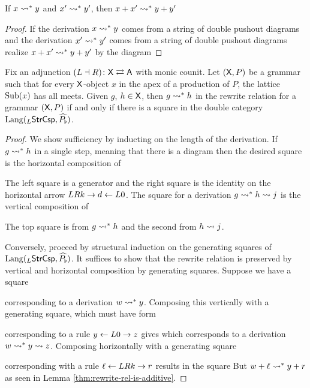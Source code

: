 \documentclass{amsart}
\begin{document}
\begin{lemma} \label{thm:rewrite-rel-is-additive}
  If $ x \rightsquigarrow^\ast y $ and $ x' \rightsquigarrow^\ast y' $, then
  $ x+x' \rightsquigarrow^\ast y+y' $
\end{lemma}

\begin{proof}
  If the derivation $ x \rightsquigarrow^\ast y $ comes from a string of
  double pushout diagrams
   and the derivation
  $ x' \rightsquigarrow^\ast y' $ comes from a string of double pushout
  diagrams  realize
  $ x+x' \rightsquigarrow^\ast y+y' $ by the diagram
  
\end{proof}

\begin{theorem} \label{thm:inductive-rewriting}
  Fix an adjunction
  $ (L \dashv R) \colon \mathsf{X} \rightleftarrows \mathsf{A} $ with monic
  counit. Let $ ( \mathsf{X} , P ) $ be a grammar such
  that for every $ \mathsf{X} $-object $ x $ in the apex
  of a production of $ P $, the lattice
  $ \operatorname{Sub} (x) $ has all meets. Given $ g $,
  $ h \in \mathsf{X} $, then $ g \rightsquigarrow^\ast h $ in the
  rewrite relation for a grammar $ ( \mathsf{X} , P ) $ if
  and only if there is a square
   in the
  double category
  $ \mathrm{Lang} ( _{L}\mathsf{StrCsp} , \widehat{P_\flat} ) $.
\end{theorem}

\begin{proof}
  We show sufficiency by inducting on the length
  of the derivation. If $ g \rightsquigarrow^\ast h $ in a
  single step, meaning that there is a diagram
   then the
  desired square is the horizontal composition of
  
  
  The left square is a generator and the right
  square is the identity on the horizontal arrow
  $ LRk \to d \leftarrow L0 $. The square for a
  derivation $ g \rightsquigarrow^\ast h \rightsquigarrow j $ is the
  vertical composition of
  
  
  The top square is from $ g \rightsquigarrow^\ast h $ and the second
  from $ h \rightsquigarrow j $.

  Conversely, proceed by structural induction on
  the generating squares of
  $ \mathrm{Lang} ( _{L}\mathsf{StrCsp} , \widehat{P_\flat} ) $.  It
  suffices to show that the rewrite relation is
  preserved by vertical and horizontal composition
  by generating squares.  Suppose we have a square
  
  corresponding to a derivation $ w \rightsquigarrow^\ast y
  $. Composing this vertically with a generating
  square, which must have form
  
  corresponding to a rule $ y \leftarrow L0 \to z $ gives
   which
  corresponds to a derivation
  $ w \rightsquigarrow^\ast y \rightsquigarrow z $.  Composing
  horizontally with a generating square
  
  corresponding with a rule $ \ell \leftarrow LRk \to r $
  results in the square
   But
  $ w+\ell \rightsquigarrow^\ast y+r $ as seen in Lemma
  \ref{thm:rewrite-rel-is-additive}.
\end{proof}
\end{document}
